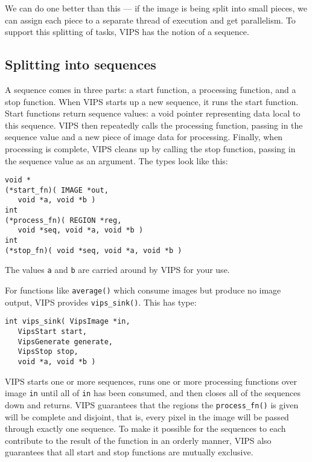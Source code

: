 We can do one better than this --- if the image is being split into small
pieces, we can assign each piece to a separate thread of execution and get
parallelism. To support this splitting of tasks, VIPS has the notion of
a sequence.

\subsection{Splitting into sequences}
\label{sec:sequence}

A sequence comes in three parts: a start function, a processing function,
and a stop function. When VIPS starts up a new sequence, it runs the
start function. Start functions return sequence values: a void pointer
representing data local to this sequence. VIPS then repeatedly calls the
processing function, passing in the sequence value and a new piece of image
data for processing. Finally, when processing is complete, VIPS cleans up by
calling the stop function, passing in the sequence value as an argument. The
types look like this:

\begin{verbatim}
void *
(*start_fn)( IMAGE *out, 
   void *a, void *b )
int 
(*process_fn)( REGION *reg, 
   void *seq, void *a, void *b )
int 
(*stop_fn)( void *seq, void *a, void *b ) 
\end{verbatim}

\noindent
The values \verb+a+ and \verb+b+ are carried around by VIPS for your use.

For functions like \verb+average()+ which consume images but produce no image
output, VIPS provides \verb+vips_sink()+. This has type:

\begin{verbatim}
int vips_sink( VipsImage *in, 
   VipsStart start, 
   VipsGenerate generate, 
   VipsStop stop,
   void *a, void *b ) 
\end{verbatim}

VIPS starts one or more sequences, runs one or more processing functions
over image \verb+in+ until all of \verb+in+ has been consumed, and then closes
all of the sequences down and returns. VIPS guarantees that the regions
the \verb+process_fn()+ is given will be complete and disjoint, that is,
every pixel in the image will be passed through exactly one sequence. To
make it possible for the sequences to each contribute to the result of the
function in an orderly manner, VIPS also guarantees that all start and stop
functions are mutually exclusive.

